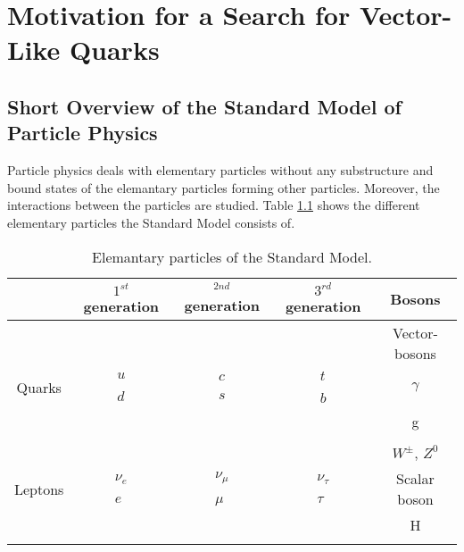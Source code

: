 \chapter{Motivation for a Search for Vector-Like Quarks}




\section{Short Overview of the Standard Model of Particle Physics}
Particle physics deals with elementary particles without any substructure and bound states of the elemantary particles forming other particles.
Moreover, the interactions between the particles  are studied.
Table \ref{standardmodel} shows the different elementary particles the Standard Model consists of.

\begin{table}
\centering
\begin{tabular}{|c|c c c|c|} 
\hline
 & $1^{st}$ generation & $^{2nd}$ generation & $3^{rd}$ generation &  Bosons \\
\hline
\hline
&	&	&	& \small{Vector-bosons}	\\
Quarks &  $\begin{matrix} u \\ \\ d \end{matrix}$ & $\begin{matrix} c \\ \\ s \end{matrix}$ & $\begin{matrix} t \\ \\ b \end{matrix}$ & $\gamma$ \\
& & & & g  \\
&	&	&	&	\\
& &  &  & $W^{\pm}$, $Z^{0}$ \\
Leptons & $\begin{matrix} \nu_{e} \\ \\ e \end{matrix}$ & $\begin{matrix} \nu_{\mu} \\ \\ \mu \end{matrix}$ & $\begin{matrix} \nu_{\tau} \\ \\ \tau \end{matrix}$ & \small{Scalar boson}  \\
&	&	&	&   H \\
&	&	&	&     \\
 \hline
\end{tabular}
\caption{Elemantary particles of the Standard Model.}
\label{standardmodel}
\end{table}



